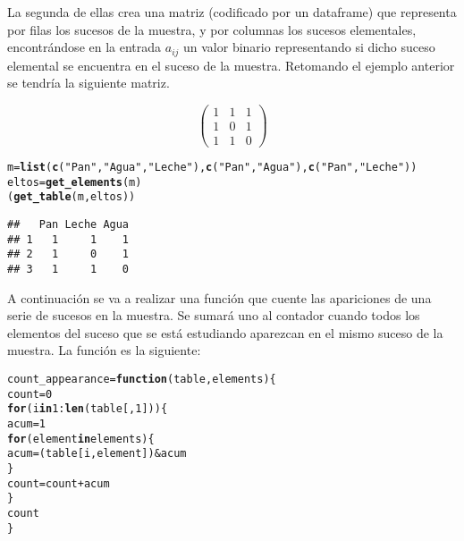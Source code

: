 \documentclass[12pt]{report}\usepackage[]{graphicx}\usepackage[dvipsnames]{xcolor}
\makeatletter
\newcommand{\hlnum}[1]{\textcolor[rgb]{0.686,0.059,0.569}{#1}}%
\newcommand{\hlstr}[1]{\textcolor[rgb]{0.192,0.494,0.8}{#1}}%
\newcommand{\hlopt}[1]{\textcolor[rgb]{0,0,0}{#1}}%
\newcommand{\hlstd}[1]{\textcolor[rgb]{0.345,0.345,0.345}{#1}}%
\newcommand{\hlkwa}[1]{\textcolor[rgb]{0.161,0.373,0.58}{\textbf{#1}}}%
\newcommand{\hlkwb}[1]{\textcolor[rgb]{0.69,0.353,0.396}{#1}}%
\newcommand{\hlkwc}[1]{\textcolor[rgb]{0.333,0.667,0.333}{#1}}%
\newcommand{\hlkwd}[1]{\textcolor[rgb]{0.737,0.353,0.396}{\textbf{#1}}}%
\newenvironment{kframe}{%
 \def\at@end@of@kframe{}%
 \ifinner\ifhmode%
  \def\at@end@of@kframe{\end{minipage}}%
  \begin{minipage}{\columnwidth}%
 \fi\fi%
 \def\FrameCommand##1{\hskip\@totalleftmargin \hskip-\fboxsep
 \colorbox{shadecolor}{##1}\hskip-\fboxsep
     \hskip-\linewidth \hskip-\@totalleftmargin \hskip\columnwidth}%
 \MakeFramed {\advance\hsize-\width
   \@totalleftmargin\z@ \linewidth\hsize
   \@setminipage}}%
 {\par\unskip\endMakeFramed%
 \at@end@of@kframe}
\newenvironment{knitrout}{}{} %
\makeatother
\begin{document}
			La segunda de ellas crea una matriz (codificado por un dataframe) que representa por filas los sucesos de la muestra, y por columnas los sucesos elementales, encontrándose en la entrada $a_{ij}$ un valor binario representando si dicho suceso elemental se encuentra en el suceso de la muestra. Retomando el ejemplo anterior se tendría la siguiente matriz. 
			
			$$
			\begin{pmatrix}
				1 & 1 & 1\\
				1 & 0 & 1\\
				1 & 1 & 0
			\end{pmatrix}
			$$
			
\begin{knitrout}
\color{fgcolor}\begin{kframe}
\begin{alltt}
\hlstd{m} \hlkwb{=} \hlkwd{list}\hlstd{(}\hlkwd{c}\hlstd{(}\hlstr{"Pan"}\hlstd{,} \hlstr{"Agua"}\hlstd{,} \hlstr{"Leche"}\hlstd{),} \hlkwd{c}\hlstd{(}\hlstr{"Pan"}\hlstd{,} \hlstr{"Agua"}\hlstd{),} \hlkwd{c}\hlstd{(}\hlstr{"Pan"}\hlstd{,} \hlstr{"Leche"}\hlstd{))}
\hlstd{eltos} \hlkwb{=} \hlkwd{get_elements}\hlstd{(m)}
\hlstd{(}\hlkwd{get_table}\hlstd{(m, eltos))}
\end{alltt}
\begin{verbatim}
##   Pan Leche Agua
## 1   1     1    1
## 2   1     0    1
## 3   1     1    0
\end{verbatim}
\end{kframe}
\end{knitrout}
			
			A continuación se va a realizar una función que cuente las apariciones de una serie de sucesos en la muestra. Se sumará uno al contador cuando todos los elementos del suceso que se está estudiando aparezcan en el mismo suceso de la muestra. La función es la siguiente:
			
\begin{knitrout}
\color{fgcolor}\begin{kframe}
\begin{alltt}
\hlstd{count_appearance} \hlkwb{=} \hlkwa{function}\hlstd{(}\hlkwc{table}\hlstd{,} \hlkwc{elements}\hlstd{) \{}
        \hlstd{count} \hlkwb{=} \hlnum{0}
        \hlkwa{for} \hlstd{(i} \hlkwa{in} \hlnum{1}\hlopt{:}\hlkwd{len}\hlstd{(table[,}\hlnum{1}\hlstd{])) \{}
                \hlstd{acum} \hlkwb{=} \hlnum{1}
                \hlkwa{for} \hlstd{(element} \hlkwa{in} \hlstd{elements) \{}
                        \hlstd{acum} \hlkwb{=} \hlstd{(table[i,element])} \hlopt{&} \hlstd{acum}
                \hlstd{\}}
                \hlstd{count} \hlkwb{=} \hlstd{count} \hlopt{+} \hlstd{acum}
        \hlstd{\}}
        \hlstd{count}
\hlstd{\}}
\end{alltt}
\end{kframe}
\end{knitrout}
			
\end{document}
